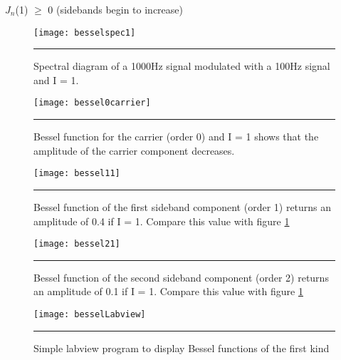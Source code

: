 \hspace{1cm} $J_{n}$(1) $\geq$ 0 (sidebands begin to increase)  
\begin{figure}[htbp]
\centering
\texttt{[image: besselspec1]}
\rule{30em}{0.5pt}
\caption[Spectrum of 1000Hz modulated with 100Hz signal]{Spectral diagram of a 1000Hz signal modulated with a 100Hz signal and I = 1.}
\label{fig:besselspec1}
\end{figure}
\begin{figure}[htbp]
\centering
\texttt{[image: bessel0carrier]}
\rule{30em}{0.5pt}
\caption[Bessel function of order 0, I = 1]{Bessel function for the carrier (order 0) and I = 1 shows that the amplitude of the carrier component decreases.}
\label{fig:bessel0carrier}
\end{figure}
\begin{figure}[htbp]
\centering
\texttt{[image: bessel11]}
\rule{30em}{0.5pt}
\caption[Bessel function of order 1, I = 1]{Bessel function of the first sideband component (order 1) returns an amplitude of 0.4 if I = 1. Compare this value with figure \ref{fig:besselspec1}}
\label{fig:bessel11}
\end{figure}
\begin{figure}[htbp]
\centering
\texttt{[image: bessel21]}
\rule{30em}{0.5pt}
\caption[Bessel function of order 2, I = 1]{Bessel function of the second sideband component (order 2) returns an amplitude of 0.1 if I = 1. Compare this value with figure \ref{fig:besselspec1}}
\label{fig:bessel21}
\end{figure}
\begin{figure}[htbp]
\centering
\texttt{[image: besselLabview]}
\rule{30em}{0.5pt}
\caption[Bessel functions in Labview]{Simple labview program to display Bessel functions of the first kind}
\label{fig:besselLabview}
\end{figure}
